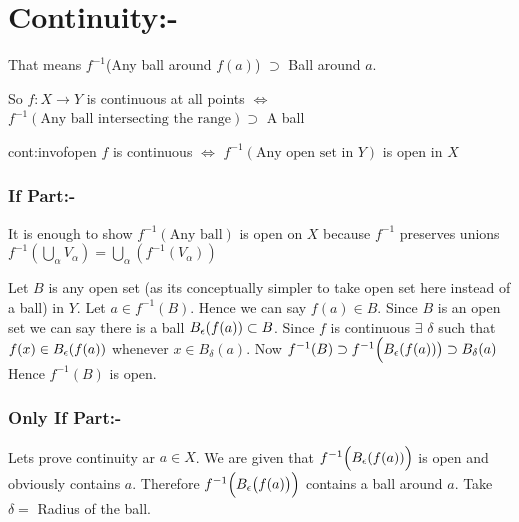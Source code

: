 \section{Continuity:-}
\setlength{\parindent}{0cm}That means $f^{-1}$(Any ball around $f(a)$) $\supset$ Ball around $a$.\setlength{\parindent}{1cm}

So $f:X\to Y$ is continuous at all points $\iff$ $f^{-1}(\text{Any ball intersecting the range})\supset $ A ball
\begin{Theorem}{}{cont:invofopen}
	$f$ is continuous $\iff$ $f^{-1}(\text{Any open set in }Y)$ is open in $X$
\end{Theorem}
\begin{myproof}
	\subsubsection*{If Part:-}
	It is enough to show $f^{-1}(\text{Any ball})$ is open on $X$ because $f^{-1}$ preserves unions $f^{-1}\left(\bigcup\limits_{\alpha}V_{\alpha}\right)=\bigcup\limits_{\alpha}\left(f^{-1}(V_{\alpha})\right)$

	Let $B$ is any open set (as its conceptually simpler to take open set here instead of a ball) in $Y$. Let $a\in f^{-1}(B)$. Hence we can say $f(a)\in B$. Since $B$ is an open set we can say there is a ball $B_{\epsilon}(f(a))\subset B$. Since $f$ is continuous $\exists$ $\delta $ such that $f(x)\in B_{\epsilon}(f(a))$ whenever $x\in B_{\delta}(a)$. Now $f^{-1}(B)\supset f^{-1}\Big(B_{\epsilon}(f(a))\big)\supset B_{\delta}(a)$ Hence $f^{-1} (B)$ is open.

	\subsubsection*{Only If Part:-}
	Lets prove continuity ar $a\in X$. We are given that $f^{-1}\Big(B_{\epsilon}(f(a))\Big)$ is open and obviously contains $a$. Therefore $f^{-1}\Big(B_{\epsilon}\big(f(a)\big)\Big)$ contains a ball around $a$. Take $\delta=$ Radius of the ball.
\end{myproof}

